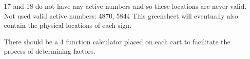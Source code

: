 \documentclass[green]{elementals}
\begin{document}
17 and 18 do not have any active numbers and so these locations are never valid.
Not used valid active numbers: 4870, 5844
This greensheet will eventually also contain the physical locations of each sign.

{\large There should be a 4 function calculator placed on each cart to facilitate the process of determining factors.}
\end{document}
